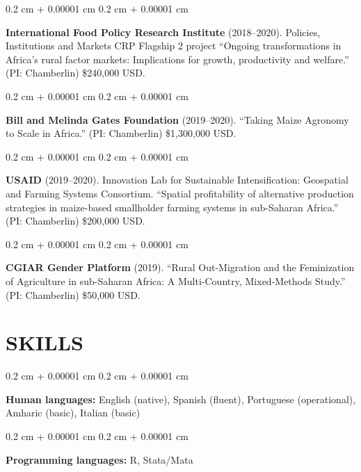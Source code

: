 \documentclass[10pt, letterpaper]{article}
\newenvironment{onecolentry}{
    \begin{adjustwidth}{
        0.2 cm + 0.00001 cm
    }{
        0.2 cm + 0.00001 cm
    }
}{
    \end{adjustwidth}
} %
\begin{document}
        \vspace{0.15 cm}

        \begin{onecolentry}
            \textbf{International Food Policy Research Institute} (2018--2020). Policies, Institutions and Markets CRP Flagship 2 project ``Ongoing transformations in Africa's rural factor markets: Implications for growth, productivity and welfare.'' (PI: Chamberlin) \$240,000 USD.
        \end{onecolentry}

        \vspace{0.15 cm}

        \begin{onecolentry}
            \textbf{Bill and Melinda Gates Foundation} (2019--2020). ``Taking Maize Agronomy to Scale in Africa.'' (PI: Chamberlin) \$1,300,000 USD.
        \end{onecolentry}

        \vspace{0.15 cm}

        \begin{onecolentry}
            \textbf{USAID} (2019--2020). Innovation Lab for Sustainable Intensification: Geospatial and Farming Systems Consortium. ``Spatial profitability of alternative production strategies in maize-based smallholder farming systems in sub-Saharan Africa.'' (PI: Chamberlin) \$200,000 USD.
        \end{onecolentry}

        \vspace{0.15 cm}

        \begin{onecolentry}
            \textbf{CGIAR Gender Platform} (2019). ``Rural Out-Migration and the Feminization of Agriculture in sub-Saharan Africa: A Multi-Country, Mixed-Methods Study.'' (PI: Chamberlin) \$50,000 USD.
        \end{onecolentry}


    \section{SKILLS}

        \begin{onecolentry}
            \textbf{Human languages:} English (native), Spanish (fluent), Portuguese (operational), Amharic (basic), Italian (basic)
        \end{onecolentry}

        \vspace{0.2 cm}

        \begin{onecolentry}
            \textbf{Programming languages:} R, Stata/Mata
        \end{onecolentry}

        \vspace{0.2 cm}




    
\end{document}
